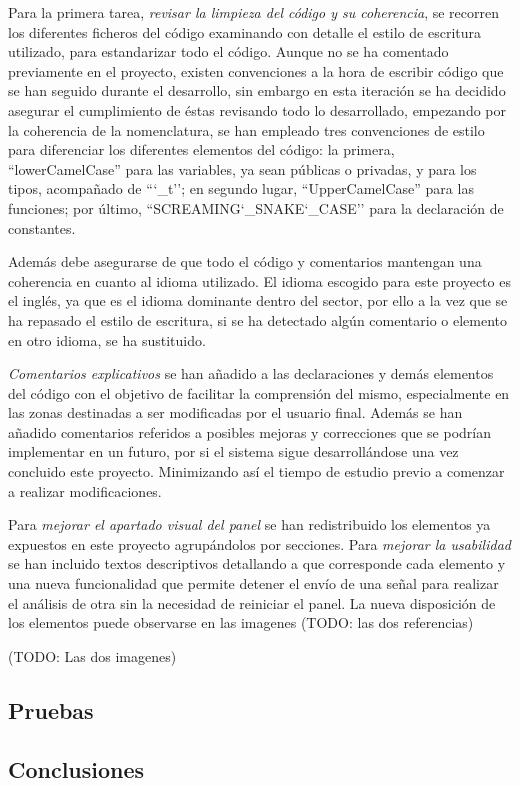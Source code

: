         Para la primera tarea, \textit{revisar la limpieza del código y su coherencia}, se recorren los diferentes ficheros del código examinando con detalle el estilo de escritura utilizado, para estandarizar todo el código. Aunque no se ha comentado previamente en el proyecto, existen convenciones a la hora de escribir código que se han seguido durante el desarrollo, sin embargo en esta iteración se ha decidido asegurar el cumplimiento de éstas revisando todo lo desarrollado, empezando por la coherencia de la nomenclatura, se han empleado tres convenciones de estilo para diferenciar los diferentes elementos del código: la primera,  ``lowerCamelCase'' para las variables, ya sean públicas o privadas, y para los tipos, acompañado de ``\char`_t''; en segundo lugar, ``UpperCamelCase'' para las funciones; por último,  ``SCREAMING\char`_SNAKE\char`_CASE'' para la declaración de constantes.
        
        Además debe asegurarse de que todo el código y comentarios mantengan una coherencia en cuanto al idioma utilizado. El idioma escogido para este proyecto es el inglés, ya que es el idioma dominante dentro del sector, por ello a la vez que se ha repasado el estilo de escritura, si se ha detectado algún comentario o elemento en otro idioma, se ha sustituido.
        
       \textit{Comentarios explicativos} se han añadido a las declaraciones y demás elementos del código con el objetivo de facilitar la comprensión del mismo, especialmente en las zonas destinadas a ser modificadas por el usuario final. Además se han añadido comentarios referidos a posibles mejoras y correcciones que se podrían implementar en un futuro, por si el sistema sigue desarrollándose una vez concluido este proyecto. Minimizando así el tiempo de estudio previo a comenzar a realizar modificaciones.
       
       Para \textit{mejorar el apartado visual del panel} se han redistribuido los elementos ya expuestos en este proyecto agrupándolos por secciones. Para \textit{mejorar la usabilidad} se han incluido textos descriptivos detallando a que corresponde cada elemento y una nueva funcionalidad que permite detener el envío de una señal para realizar el análisis de otra sin la necesidad de reiniciar el panel. La nueva disposición de los elementos puede observarse en las imagenes (TODO: las dos referencias)
       
       (TODO: Las dos imagenes)
       
    \subsection{Pruebas}
    \subsection{Conclusiones}